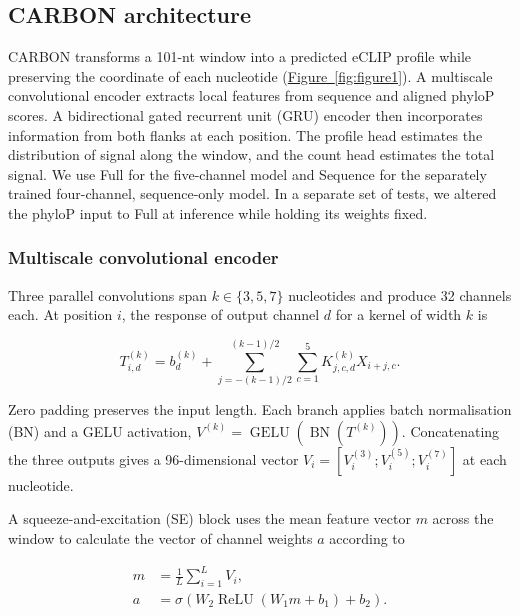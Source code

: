 \documentclass[webpdf,contemporary,large]{current_assets/oup-authoring-template}
\newcommand{\figrefwhole}[1]{\hyperref[#1]{Figure~\ref*{#1}}}
\begin{document}
\subsection{CARBON architecture}\label{sec:algorithm}

CARBON transforms a 101-nt window into a predicted eCLIP profile while preserving the coordinate of each nucleotide (\figrefwhole{fig:figure1}). A multiscale convolutional encoder extracts local features from sequence and aligned phyloP scores. A bidirectional gated recurrent unit (GRU) encoder then incorporates information from both flanks at each position. The profile head estimates the distribution of signal along the window, and the count head estimates the total signal. We use Full for the five-channel model and Sequence for the separately trained four-channel, sequence-only model. In a separate set of tests, we altered the phyloP input to Full at inference while holding its weights fixed.

\subsubsection{Multiscale convolutional encoder}\label{subsec:blocks}

Three parallel convolutions span $k\in\{3,5,7\}$ nucleotides and produce 32 channels each. At position $i$, the response of output channel $d$ for a kernel of width $k$ is

\begin{equation}
T^{(k)}_{i,d}=b^{(k)}_d+
\sum_{j=-(k-1)/2}^{(k-1)/2}\sum_{c=1}^{5}
K^{(k)}_{j,c,d}X_{i+j,c}.
\label{eq:multiscale_convolution}
\end{equation}

Zero padding preserves the input length. Each branch applies batch normalisation (BN) and a GELU activation, $V^{(k)}=\operatorname{GELU}(\operatorname{BN}(T^{(k)}))$. Concatenating the three outputs gives a 96-dimensional vector $V_i=[V_i^{(3)};V_i^{(5)};V_i^{(7)}]$ at each nucleotide.

A squeeze-and-excitation (SE) block \citep{hu2018senet} uses the mean feature vector $m$ across the window to calculate the vector of channel weights $a$ according to

\begin{equation}
\begin{aligned}
m&=\frac1L\sum_{i=1}^{L}V_i,\\
a&=\sigma\!\left(W_2\operatorname{ReLU}(W_1m+b_1)+b_2\right).
\end{aligned}
\label{eq:se_gate}
\end{equation}
\end{document}
